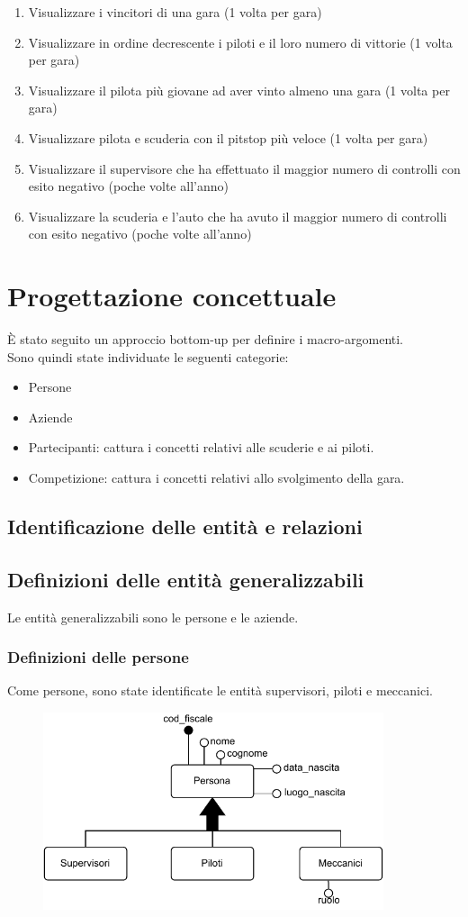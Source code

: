 \documentclass[11pt]{article}
\begin{document}
\begin{enumerate}
    \item Visualizzare i vincitori di una gara (1 volta per gara)
    \item Visualizzare in ordine decrescente i piloti e il loro numero di vittorie (1 volta per gara)
    \item Visualizzare il pilota più giovane ad aver vinto almeno una gara (1 volta per gara)
    \item Visualizzare pilota e scuderia con il pitstop più veloce (1 volta per gara)
    \item Visualizzare il supervisore che ha effettuato il maggior numero di controlli con esito negativo (poche volte all'anno)
    \item Visualizzare la scuderia e l'auto che ha avuto il maggior numero di controlli con esito negativo (poche volte all'anno)
\end{enumerate}

\section{Progettazione concettuale}
È stato seguito un approccio bottom-up per definire i macro-argomenti.\\
Sono quindi state individuate le seguenti categorie:
\begin{itemize}
    \item Persone
    \item Aziende
    \item Partecipanti: cattura i concetti relativi alle scuderie e ai piloti.
    \item Competizione: cattura i concetti relativi allo svolgimento della gara.
\end{itemize}
\subsection{Identificazione delle entità e relazioni}

\subsection{Definizioni delle entità generalizzabili}
Le entità generalizzabili sono le persone e le aziende.
\subsubsection{Definizioni delle persone}
Come persone, sono state identificate le entità supervisori, piloti e meccanici. 
\begin{figure}[H]
    \centering
    \includegraphics[width=10cm]{../er/gare_persone.pdf}
\end{figure}
\end{document}
